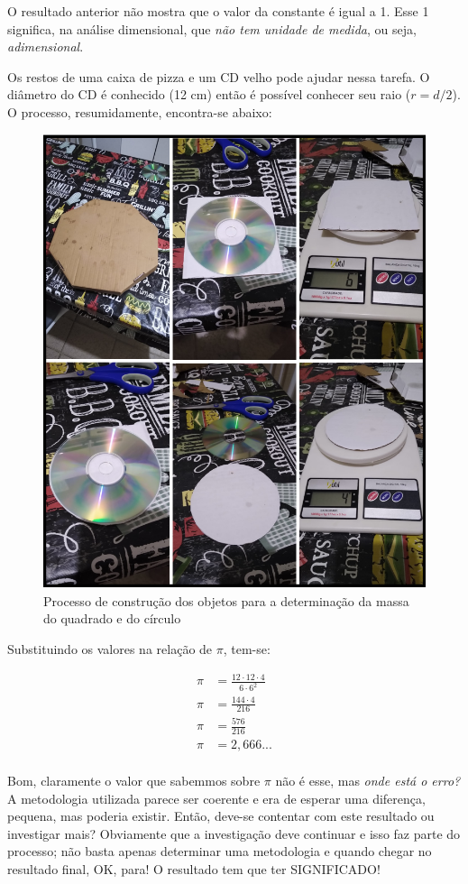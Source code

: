 O resultado anterior não mostra que o valor da constante é igual a 1. Esse 1 significa, na análise dimensional, que \textit{não tem unidade de medida}, ou seja, \textit{adimensional}.

Os restos de uma caixa de pizza e um CD velho pode ajudar nessa tarefa. O diâmetro do CD é conhecido (12 cm) então é possível conhecer seu raio ($r = d/2$). O processo, resumidamente, encontra-se abaixo:

\begin{figure}[H]
	\centering
	\includegraphics[width=0.7\linewidth]{PROGRAMACAO/pic/educacao/processo_01}
	\caption[]{Processo de construção dos objetos para a determinação da massa do quadrado e do círculo}
	\label{fig:processo01}
\end{figure}

Substituindo os valores na relação de $\pi$, tem-se:

\begin{ceqn}
	\begin{align*}
	\pi &= \frac{12 \cdot 12 \cdot 4}{6 \cdot 6^2} \\
	\pi &= \frac{144 \cdot 4}{216} \\
	\pi &= \frac{576}{216} \\
	\pi &= 2,666... \\
	\end{align*}
\end{ceqn}

Bom, claramente o valor que sabemmos sobre $\pi$ não é esse, mas \textit{onde está o erro?} A metodologia utilizada parece ser coerente e era de esperar uma diferença, pequena, mas poderia existir. Então, deve-se contentar com este resultado ou investigar mais? Obviamente que a investigação deve continuar e isso faz parte do processo; não basta apenas determinar uma metodologia e quando chegar no resultado final, OK, para! O resultado tem que ter SIGNIFICADO!

